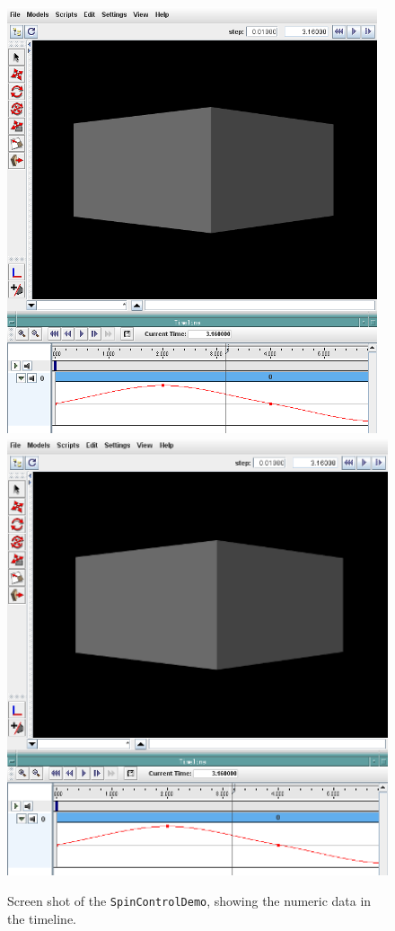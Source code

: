 \begin{figure}[ht]
\begin{center}
\iflatexml
 \includegraphics[]{images/spinControlProbe}
\else
 \includegraphics[width=4.5in]{images/spinControlProbe}
\fi
\end{center}
\caption{Screen shot of the {\tt SpinControlDemo}, showing the
numeric data in the timeline.}
\label{spinControlProbe:fig}
\end{figure}

